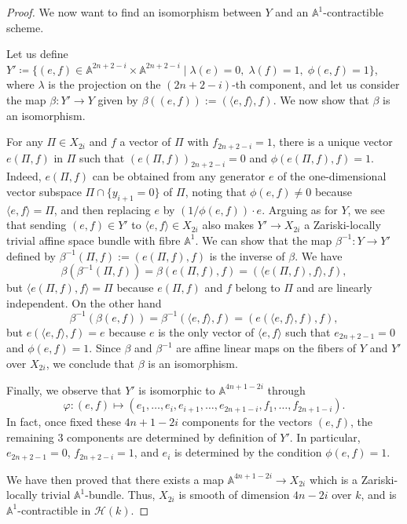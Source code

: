 \documentclass[10pt]{amsart}
\theoremstyle{definition}
\theoremstyle{plain}
\numberwithin{equation}{section}
\newcommand{\0}{\emptyset}
\newcommand{\sH}{{\mathcal H}}
\newcommand{\A}{{\mathbb A}}
\begin{document}
\begin{proof}
We now want to find an isomorphism between $Y$ and an $\A^1$-contractible scheme.

Let us define $Y' \coloneqq \{(e,f) \in \mathbb{A}^{2n+2-i} \times \mathbb{A}^{2n+2-i} \mid \lambda(e)=0, \; \lambda(f)=1, \; \phi(e,f)=1\}$, where $\lambda$ is the projection on the $(2n+2-i)$-th component, and let us consider the map $\beta: Y' \to Y$ given by $\beta((e,f)):=(\langle e,f \rangle,f).$ We now show that $\beta$ is an isomorphism.


For any $\Pi \in X_{2i}$ and $f$ a vector of $\Pi$ with $f_{2n+2-i}=1$, there is a unique vector $e(\Pi,f)$ in $\Pi$ such that $(e(\Pi,f))_{2n+2-i}=0$ and $\phi(e(\Pi,f),f)=1$. Indeed, $e(\Pi, f)$ can be obtained from any generator $e$ of the one-dimensional vector subspace $\Pi \cap \{y_{i+1}=0\}$ of $\Pi$, noting that $\phi(e,f) \neq 0$ because $\langle e,f \rangle =\Pi$, and then replacing $e$ by $(1/\phi(e,f))\cdot e$. Arguing as for $Y$, we see that sending $(e,f)\in Y'$ to $\langle e,f \rangle\in X_{2i}$ also makes $Y'\to X_{2i}$ a Zariski-locally trivial affine space bundle with fibre $\A^1$. We can show that the map $\beta^{-1}:Y \to Y'$ defined by $\beta^{-1}(\Pi, f):=(e(\Pi,f),f)$ is the inverse of $\beta$. We have
$$\beta(\beta^{-1}(\Pi,f))=\beta(e(\Pi,f),f)=(\langle e(\Pi,f),f \rangle, f),$$
but $\langle e(\Pi,f),f \rangle=\Pi$ because $e(\Pi,f)$ and $f$ belong to $\Pi$ and are linearly independent. On the other hand
$$\beta^{-1}(\beta(e,f))=\beta^{-1}(\langle e,f \rangle, f)=(e(\langle e,f \rangle,f),f),$$
but $e(\langle e,f \rangle,f)=e$ because $e$ is the only vector of $\langle e,f \rangle$ such that $e_{2n+2-1}=0$ and $\phi(e,f)=1$. Since $\beta$ and $\beta^{-1}$ are affine linear maps on the fibers of $Y$ and $Y'$ over $X_{2i}$, we conclude that $\beta$ is an isomorphism.

Finally, we observe that $Y'$ is isomorphic to $\A^{4n+1-2i}$ through 
$$\varphi:(e,f) \mapsto (e_1,\ldots, e_i, e_{i+1}, \ldots, e_{2n+1-i}, f_1, \ldots , f_{2n+1-i}).$$
In fact, once fixed these $4n+1-2i$ components for the vectors $(e,f)$, the remaining $3$ components are determined by definition of $Y'$. In particular, $e_{2n+2-1}=0$, $f_{2n+2-i}=1$, and $e_i$ is determined by the condition $\phi(e,f)=1$.

We have then proved that there exists a map $\A^{4n+1-2i} \to X_{2i}$ which is a Zariski-locally trivial $\A^1$-bundle. Thus, $X_{2i}$ is smooth of dimension $4n-2i$ over $k$, and is $\A^1$-contractible in $\sH(k)$.
\end{proof}
\end{document}
